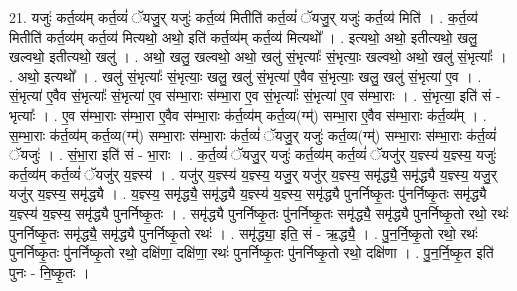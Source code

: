 \documentclass[17pt]{extarticle}
\begin{document}
21. यजुः॑ कर्त॒व्य॑म् कर्त॒व्यं॑ ॅयजु॒र् यजुः॑ कर्त॒व्य॑ मितीति॑ कर्त॒व्यं॑ ॅयजु॒र् यजुः॑ कर्त॒व्य॑ मिति॑ । . क॒र्त॒व्य॑ मितीति॑ कर्त॒व्य॑म् कर्त॒व्य॑ मित्यथो॒ अथो॒ इति॑ कर्त॒व्य॑म् कर्त॒व्य॑ मित्यथो᳚ । . इत्यथो॒ अथो॒ इतीत्यथो॒ खलु॒ खल्वथो॒ इतीत्यथो॒ खलु॑ । . अथो॒ खलु॒ खल्वथो॒ अथो॒ खलु॑ सं॒भृत्याः᳚ सं॒भृत्याः॒ खल्वथो॒ अथो॒ खलु॑ सं॒भृत्याः᳚ । . अथो॒ इत्यथो᳚ । . खलु॑ सं॒भृत्याः᳚ सं॒भृत्याः॒ खलु॒ खलु॑ सं॒भृत्या॑ ए॒वैव सं॒भृत्याः॒ खलु॒ खलु॑ सं॒भृत्या॑ ए॒व । . सं॒भृत्या॑ ए॒वैव सं॒भृत्याः᳚ सं॒भृत्या॑ ए॒व स॑म्भा॒राः स॑म्भा॒रा ए॒व सं॒भृत्याः᳚ सं॒भृत्या॑ ए॒व स॑म्भा॒राः । . सं॒भृत्या॒ इति॑ सं - भृत्याः᳚ । . ए॒व स॑म्भा॒राः स॑म्भा॒रा ए॒वैव स॑म्भा॒राः क॑र्त॒व्य॑म् कर्त॒व्य(ग्म्॑) सम्भा॒रा ए॒वैव स॑म्भा॒राः क॑र्त॒व्य᳚म् । . स॒म्भा॒राः क॑र्त॒व्य॑म् कर्त॒व्य(ग्म्॑) सम्भा॒राः स॑म्भा॒राः क॑र्त॒व्यं॑ ॅयजु॒र् यजुः॑ कर्त॒व्य(ग्म्॑) सम्भा॒राः स॑म्भा॒राः क॑र्त॒व्यं॑ ॅयजुः॑ । . सं॒भा॒रा इति॑ सं - भा॒राः । . क॒र्त॒व्यं॑ ॅयजु॒र् यजुः॑ कर्त॒व्य॑म् कर्त॒व्यं॑ ॅयजु॑र् य॒ज्ञ्स्य॑ य॒ज्ञ्स्य॒ यजुः॑ कर्त॒व्य॑म् कर्त॒व्यं॑ ॅयजु॑र् य॒ज्ञ्स्य॑ । . यजु॑र् य॒ज्ञ्स्य॑ य॒ज्ञ्स्य॒ यजु॒र् यजु॑र् य॒ज्ञ्स्य॒ समृ॑द्ध्यै॒ समृ॑द्ध्यै य॒ज्ञ्स्य॒ यजु॒र् यजु॑र् य॒ज्ञ्स्य॒ समृ॑द्ध्यै । . य॒ज्ञ्स्य॒ समृ॑द्ध्यै॒ समृ॑द्ध्यै य॒ज्ञ्स्य॑ य॒ज्ञ्स्य॒ समृ॑द्ध्यै पुनर्निष्कृ॒तः पु॑नर्निष्कृ॒तः समृ॑द्ध्यै य॒ज्ञ्स्य॑ य॒ज्ञ्स्य॒ समृ॑द्ध्यै पुनर्निष्कृ॒तः । . समृ॑द्ध्यै पुनर्निष्कृ॒तः पु॑नर्निष्कृ॒तः समृ॑द्ध्यै॒ समृ॑द्ध्यै पुनर्निष्कृ॒तो रथो॒ रथः॑ पुनर्निष्कृ॒तः समृ॑द्ध्यै॒ समृ॑द्ध्यै पुनर्निष्कृ॒तो रथः॑ । . समृ॑द्ध्या॒ इति॒ सं - ऋ॒द्ध्यै॒ । . पु॒न॒र्नि॒ष्कृ॒तो रथो॒ रथः॑ पुनर्निष्कृ॒तः पु॑नर्निष्कृ॒तो रथो॒ दक्षि॑णा॒ दक्षि॑णा॒ रथः॑ पुनर्निष्कृ॒तः पु॑नर्निष्कृ॒तो रथो॒ दक्षि॑णा । . पु॒न॒र्नि॒ष्कृ॒त इति॑ पुनः - नि॒ष्कृ॒तः । \newline
\end{document}
